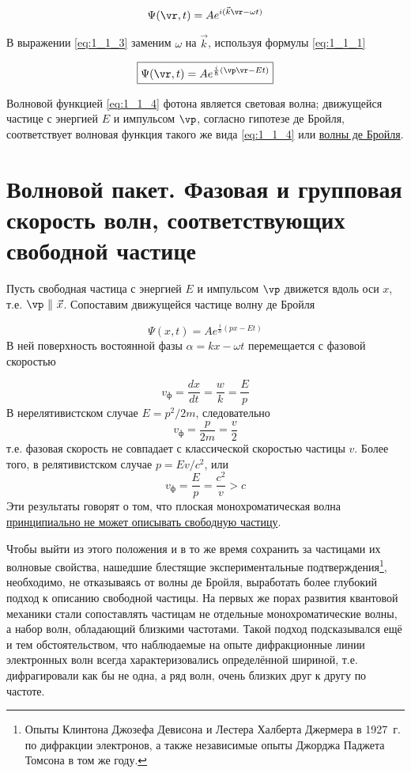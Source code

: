 \begin{equation}
\label{eq:1_1_3}
\Psi (\vr, t) = A e^{i(\vec{k}\vr - \omega t)}
\end{equation}

В выражении \eqref{eq:1_1_3} заменим $\omega$ на $\vec{k}$, используя формулы \eqref{eq:1_1_1}

\begin{equation}
\label{eq:1_1_4}
\boxed{\Psi(\vr,t) = A e^{\frac{i}{\hbar}(\vp\vr - Et)}}
\end{equation}

Волновой функцией \eqref{eq:1_1_4} фотона является световая волна; движущейся частице с энергией $E$ и импульсом $\vp$, согласно гипотезе де Бройля, соответствует волновая функция такого же вида \eqref{eq:1_1_4} или \underline{волны де Бройля}.

\begin{sloppypar}
  \section{Волновой пакет. Фазовая и групповая скорость волн, соответствующих свободной частице}
\end{sloppypar}

Пусть свободная частица с энергией $E$ и импульсом $\vp$ движется вдоль оси $x$, т.е. $\vp~ \|~ \vec{x}$. Сопоставим движущейся частице волну де Бройля

\begin{equation}
\label{eq:1_2_1}
\Psi(x,t) = A e^{\frac{i}{\hbar}(px - Et)}
\end{equation}%
%
В ней поверхность востоянной фазы $\alpha = kx - \omega t$ перемещается с фазовой скоростью

\begin{equation}
\label{eq:1_2_2}
v_{\text{ф}} = \frac{dx}{dt} = \frac{w}{k} = \frac{E}{p}
\end{equation}%
%
В нерелятивистском случае $E = p^2/{2m}$, следовательно
$$
v_{\text{ф}} = \frac{p}{2m} = \frac{v}{2}
$$
т.е. фазовая скорость не совпадает с классической скоростью частицы $v$. Более того, в релятивистском случае $p = Ev/c^2$, или
$$
v_{\text{ф}} = \frac{E}{p} = \frac{c^2}{v} > c
$$
Эти результаты говорят о том, что плоская монохроматическая волна \underline{принципиально не может описывать свободную частицу}.

Чтобы выйти из этого положения и в то же время сохранить за частицами их волновые свойства, нашедшие блестящие экспериментальные подтверждения\footnote{Опыты Клинтона Джозефа Девисона и Лестера Халберта Джермера в 1927~г. по дифракции электронов, а также независимые опыты Джорджа Паджета Томсона в том же году.}, необходимо, не отказываясь от волны де Бройля, выработать более глубокий подход к описанию свободной частицы. На первых же порах развития квантовой механики стали сопоставлять частицам не отдельные монохроматические волны, а набор волн, обладающий близкими частотами. Такой подход подсказывался ещё и тем обстоятельством, что наблюдаемые на опыте дифракционные линии электронных волн всегда характеризовались определённой шириной, т.е. дифрагировали как бы не одна, а ряд волн, очень близких друг к другу по частоте.

